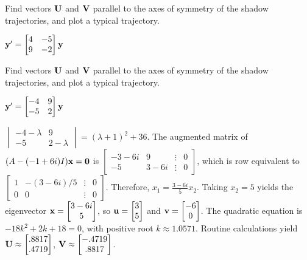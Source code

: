 \documentclass{ximera}
\begin{document}
 \begin{problem}\label{exer:10.6.35}  
 Find vectors
${\bf U}$ and ${\bf V}$ parallel to the axes of symmetry of the shadow
trajectories, and plot a typical trajectory.

$ {\bf y}'= \begin{bmatrix}4&-5\\9&-2\end{bmatrix}{\bf y}$
 \end{problem}

 \begin{problem}\label{exer:10.6.36}  
 Find vectors
${\bf U}$ and ${\bf V}$ parallel to the axes of symmetry of the shadow
trajectories, and plot a typical trajectory.

$ {\bf y}'= \begin{bmatrix}-4&9\\-5&2\end{bmatrix}{\bf y}$

\begin{solution}
    $\begin{vmatrix}-4-\lambda&9\\-5&2-\lambda
\end{vmatrix}=(\lambda+1)^2+36$.
The augmented matrix of $(A-(-1+6i)I){\bf x}={\bf 0}$ is
$ \begin{bmatrix}-3-6i&9&\vdots&0\\
-5&3-6i&\vdots&0  \end{bmatrix}$,
which is row equivalent to
$ \begin{bmatrix} 1&-(3-6i)/5&\vdots&0\\ 0&0&\vdots&0
 \end{bmatrix}$.
Therefore, $x_1=\frac{3-6i}{5}x_2$. Taking $x_2=5$
yields the eigenvector
 ${\bf x}= \begin{bmatrix}3-6i\\5 \end{bmatrix}$,
so ${\bf u}=  \begin{bmatrix}3\\5 \end{bmatrix}$ and ${\bf v}=  \begin{bmatrix}-6\\0 \end{bmatrix}$.
The quadratic equation is $-18k^2+2k+18=0$, with positive root
$k\approx1.0571$.
 Routine calculations yield
 ${\bf U}\approx  \begin{bmatrix}.8817\\.4719 \end{bmatrix}$,
${\bf V}\approx  \begin{bmatrix}-.4719\\.8817 \end{bmatrix}$.
\end{solution}
 \end{problem}
 
\end{document}
